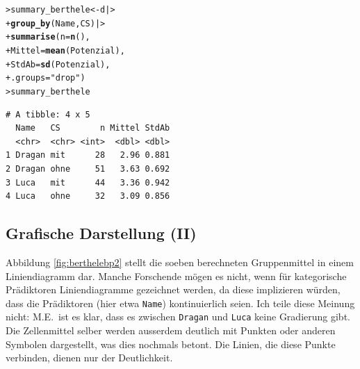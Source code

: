 \documentclass[oneside, 10pt]{book}\usepackage[]{graphicx}\usepackage[]{xcolor}
\makeatletter
\newcommand{\hlstr}[1]{\textcolor[rgb]{0.192,0.494,0.8}{#1}}%
\newcommand{\hlstd}[1]{\textcolor[rgb]{0.345,0.345,0.345}{#1}}%
\newcommand{\hlkwb}[1]{\textcolor[rgb]{0.69,0.353,0.396}{#1}}%
\newcommand{\hlkwc}[1]{\textcolor[rgb]{0.333,0.667,0.333}{#1}}%
\newcommand{\hlkwd}[1]{\textcolor[rgb]{0.737,0.353,0.396}{\textbf{#1}}}%
\newenvironment{kframe}{%
 \def\at@end@of@kframe{}%
 \ifinner\ifhmode%
  \def\at@end@of@kframe{\end{minipage}}%
  \begin{minipage}{\columnwidth}%
 \fi\fi%
 \def\FrameCommand##1{\hskip\@totalleftmargin \hskip-\fboxsep
 \colorbox{shadecolor}{##1}\hskip-\fboxsep
     \hskip-\linewidth \hskip-\@totalleftmargin \hskip\columnwidth}%
 \MakeFramed {\advance\hsize-\width
   \@totalleftmargin\z@ \linewidth\hsize
   \@setminipage}}%
 {\par\unskip\endMakeFramed%
 \at@end@of@kframe}
\newenvironment{knitrout}{}{} %
\makeatother
\begin{document}
\begin{knitrout}
\color{fgcolor}\begin{kframe}
\begin{alltt}
\hlstd{> }\hlstd{summary_berthele} \hlkwb{<-} \hlstd{d |>}
\hlstd{+ }  \hlkwd{group_by}\hlstd{(Name, CS) |>}
\hlstd{+ }  \hlkwd{summarise}\hlstd{(}\hlkwc{n} \hlstd{=} \hlkwd{n}\hlstd{(),}
\hlstd{+ }            \hlkwc{Mittel} \hlstd{=} \hlkwd{mean}\hlstd{(Potenzial),}
\hlstd{+ }            \hlkwc{StdAb} \hlstd{=} \hlkwd{sd}\hlstd{(Potenzial),}
\hlstd{+ }            \hlkwc{.groups} \hlstd{=} \hlstr{"drop"}\hlstd{)}
\hlstd{> }\hlstd{summary_berthele}
\end{alltt}
\begin{verbatim}
# A tibble: 4 x 5
  Name   CS        n Mittel StdAb
  <chr>  <chr> <int>  <dbl> <dbl>
1 Dragan mit      28   2.96 0.881
2 Dragan ohne     51   3.63 0.692
3 Luca   mit      44   3.36 0.942
4 Luca   ohne     32   3.09 0.856
\end{verbatim}
\end{kframe}
\end{knitrout}

\subsection{Grafische Darstellung (II)}
Abbildung \ref{fig:berthelebp2} stellt die soeben berechneten
Gruppenmittel in einem Liniendiagramm dar. Manche Forschende
mögen es nicht, wenn für kategorische Prädiktoren
Liniendiagramme gezeichnet werden, da diese implizieren würden,
dass die Prädiktoren (hier etwa \texttt{Name}) kontinuierlich
seien. Ich teile diese Meinung nicht: M.E.\ ist es klar, dass
es zwischen \texttt{Dragan} und \texttt{Luca} keine Gradierung
gibt. Die Zellenmittel selber werden ausserdem deutlich mit Punkten
oder anderen Symbolen dargestellt, was dies nochmals betont.
Die Linien, die diese Punkte verbinden, dienen nur der Deutlichkeit.
\end{document}
